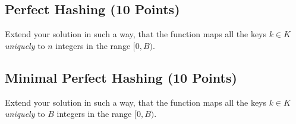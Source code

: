 \documentclass{article}
\begin{document}
\subsection{Perfect Hashing (10 Points)}

Extend your solution in such a way, that the function maps all the keys $k \in K$ \emph{uniquely} to $n$ integers in the range $[0, B)$.

\subsection{Minimal Perfect Hashing (10 Points)}

Extend your solution in such a way, that the function maps all the keys $k \in K$ \emph{uniquely} to $B$ integers in the range $[0, B)$.
\end{document}
